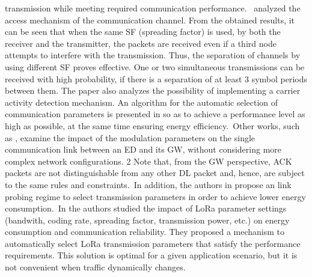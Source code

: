 transmission while meeting required communication performance.~\citet{bor_lora_nodate} analyzed the access mechanism of the communication channel. From the obtained results, it can be seen that when the same SF (spreading factor) is used, by both the receiver and the transmitter, the packets are received even if a third node attempts to interfere with the transmission. Thus, the separation of channels by using different SF proves effective. One or two simultaneous transmissions can be received with high probability, if there is a separation of at least 3 symbol periods between them. The paper also analyzes the possibility of implementing a carrier activity detection mechanism. An algorithm for the automatic selection of communication parameters is presented in \cite{bor_lora_2017} so as to achieve a performance level as high as possible, at the same time ensuring energy efficiency.~Other works, such as \cite{bor_lora_2017}, examine the impact of the modulation parameters on the single communication link between an ED and its GW, without considering more complex network configurations. 2 Note that, from the GW perspective, ACK packets are not distinguishable from any other DL packet and, hence, are subject to the same rules and constraints.~In addition, the authors in \cite{bor_lora_2017} propose an link probing regime to select transmission parameters in order to achieve lower energy consumption.~In \cite{bor_lora_2017} the authors studied the impact of LoRa parameter settings (bandwith, coding rate, spreading factor, transmission power, etc.) on energy consumption and communication reliability. They proposed a mechanism to automatically select LoRa transmission parameters that satisfy the performance requirements. This solution is optimal for a given application scenario, but it is not convenient when traffic dynamically changes.~~   \newline 
